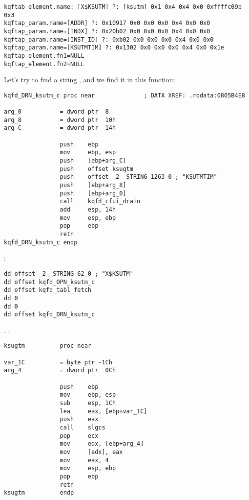 \begin{lstlisting}[caption=\IFRU{Результат работы}{Result of} \OracleTablesName]
kqftab_element.name: [X$KSUTM] ?: [ksutm] 0x1 0x4 0x4 0x0 0xffffc09b 0x3
kqftap_param.name=[ADDR] ?: 0x10917 0x0 0x0 0x0 0x4 0x0 0x0
kqftap_param.name=[INDX] ?: 0x20b02 0x0 0x0 0x0 0x4 0x0 0x0
kqftap_param.name=[INST_ID] ?: 0xb02 0x0 0x0 0x0 0x4 0x0 0x0
kqftap_param.name=[KSUTMTIM] ?: 0x1302 0x0 0x0 0x0 0x4 0x0 0x1e
kqftap_element.fn1=NULL
kqftap_element.fn2=NULL
\end{lstlisting}

{Let's try to find a string , and we find it in this function:}

\begin{lstlisting}
kqfd_DRN_ksutm_c proc near              ; DATA XREF: .rodata:0805B4E8

arg_0           = dword ptr  8
arg_8           = dword ptr  10h
arg_C           = dword ptr  14h

                push    ebp
                mov     ebp, esp
                push    [ebp+arg_C]
                push    offset ksugtm
                push    offset _2__STRING_1263_0 ; "KSUTMTIM"
                push    [ebp+arg_8]
                push    [ebp+arg_0]
                call    kqfd_cfui_drain
                add     esp, 14h
                mov     esp, ebp
                pop     ebp
                retn
kqfd_DRN_ksutm_c endp
\end{lstlisting}

   
 :

\begin{lstlisting}
dd offset _2__STRING_62_0 ; "X$KSUTM"
dd offset kqfd_OPN_ksutm_c
dd offset kqfd_tabl_fetch
dd 0
dd 0
dd offset kqfd_DRN_ksutm_c
\end{lstlisting}

. 
:

\begin{lstlisting}[caption=ksu.o]
ksugtm          proc near

var_1C          = byte ptr -1Ch
arg_4           = dword ptr  0Ch

                push    ebp
                mov     ebp, esp
                sub     esp, 1Ch
                lea     eax, [ebp+var_1C]
                push    eax
                call    slgcs
                pop     ecx
                mov     edx, [ebp+arg_4]
                mov     [edx], eax
                mov     eax, 4
                mov     esp, ebp
                pop     ebp
                retn
ksugtm          endp
\end{lstlisting}

